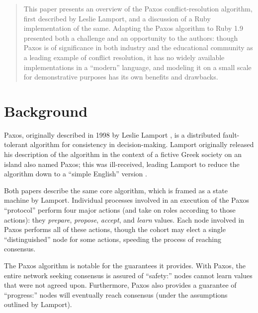 \documentclass{acm_proc_article-sp}
\begin{document}
\maketitle
\begin{abstract}

This paper presents an overview of the Paxos conflict-resolution algorithm,
first described by Leslie Lamport, and a discussion of a Ruby implementation of
the same. Adapting the Paxos algorithm to Ruby 1.9 presented both a challenge
and an opportunity to the authors: though Paxos is of significance in both
industry and the educational community as a leading example of conflict
resolution, it has no widely available implementations in a ``modern''
language, and modeling it on a small scale for demonstrative purposes has its
own benefits and drawbacks.

\end{abstract}




\section{Background}

Paxos, originally described in 1998 by Leslie Lamport \cite{paxos}, is a
distributed fault-tolerant algorithm for consistency in decision-making. Lamport
originally released his description of the algorithm in the context of a fictive
Greek society on an island also named Paxos; this was ill-received, leading
Lamport to reduce the algorithm down to a ``simple English'' version
\cite{simple-paxos}.

Both papers describe the same core algorithm, which is framed as a state machine
by Lamport. Individual processes involved in an execution of the Paxos
``protocol'' perform four major actions (and take on roles according to those
actions): they \textit{prepare}, \textit{propose}, \textit{accept}, and
\textit{learn} values. Each node involved in Paxos performs all of these
actions, though the cohort may elect a single ``distinguished'' node for some
actions, speeding the process of reaching consensus.

The Paxos algorithm is notable for the guarantees it provides. With Paxos, the
entire network seeking consensus is assured of ``safety:'' nodes cannot learn
values that were not agreed upon. Furthermore, Paxos also provides a guarantee
of ``progress:'' nodes will eventually reach consensus (under the assumptions
outlined by Lamport).
\end{document}
